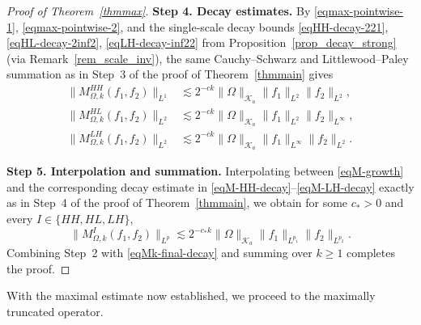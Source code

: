 \documentclass[11pt]{amsart}
\begin{document}
\begin{proof}[Proof of Theorem~\ref{thmmax}]
	\medskip
	\noindent
	\textbf{Step 4. Decay estimates.}
	By \eqref{eqmax-pointwise-1}, \eqref{eqmax-pointwise-2}, and the
	single-scale decay bounds \eqref{eqHH-decay-221},
	\eqref{eqHL-decay-2inf2}, \eqref{eqLH-decay-inf22} from
	Proposition~\ref{prop_decay_strong} (via Remark~\ref{rem_scale_inv}),
	the same Cauchy--Schwarz and Littlewood--Paley summation as in
	Step~3 of the proof of Theorem~\ref{thmmain} gives
	\begin{align}
		\|M_{\Omega,k}^{HH}(f_1,f_2)\|_{L^1}
		&\lesssim 2^{-ck}\|\Omega\|_{\mathcal K_a}
		\|f_1\|_{L^2}\|f_2\|_{L^2},\label{eqM-HH-decay}\\
		\|M_{\Omega,k}^{HL}(f_1,f_2)\|_{L^2}
		&\lesssim 2^{-ck}\|\Omega\|_{\mathcal K_a}
		\|f_1\|_{L^2}\|f_2\|_{L^\infty},\label{eqM-HL-decay}\\
		\|M_{\Omega,k}^{LH}(f_1,f_2)\|_{L^2}
		&\lesssim 2^{-ck}\|\Omega\|_{\mathcal K_a}
		\|f_1\|_{L^\infty}\|f_2\|_{L^2}.\label{eqM-LH-decay}
	\end{align}
	
	\medskip
	\noindent
	\textbf{Step 5. Interpolation and summation.}
	Interpolating between \eqref{eqM-growth} and the corresponding decay
	estimate in \eqref{eqM-HH-decay}--\eqref{eqM-LH-decay} exactly as
	in Step~4 of the proof of Theorem~\ref{thmmain}, we obtain for some
	$c_*>0$ and every $I\in\{HH,HL,LH\}$,
	\begin{equation}\label{eqMk-final-decay}
		\|M_{\Omega,k}^I(f_1,f_2)\|_{L^p}
		\lesssim 2^{-c_*k}\|\Omega\|_{\mathcal K_a}
		\|f_1\|_{L^{p_1}}\|f_2\|_{L^{p_2}}.
	\end{equation}
	Combining Step~2 with \eqref{eqMk-final-decay} and summing over
	$k\ge 1$ completes the proof.
\end{proof}

With the maximal estimate now established, we proceed to the maximally truncated operator. 
\end{document}
